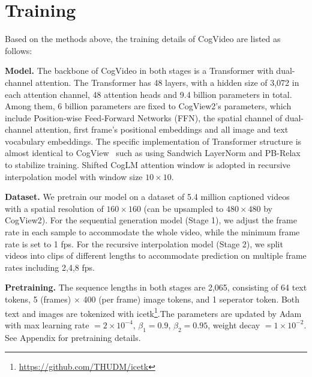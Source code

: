 
\section{Training}

Based on the methods above, the training details of CogVideo are listed as follows: 

\textbf{Model. }The backbone of CogVideo in both stages is a Transformer with dual-channel attention. The Transformer has 48 layers, with a hidden size of 3,072 in each attention channel, 48 attention heads and 9.4 billion parameters in total. Among them, 6 billion parameters are fixed to CogView2's parameters, which include Position-wise Feed-Forward Networks (FFN), the spatial channel of dual-channel attention, first frame's positional embeddings and all image and text vocabulary embeddings. The specific implementation of Transformer structure is almost identical to CogView~\cite{ding2021cogview} such as using Sandwich LayerNorm and PB-Relax to stabilize training. Shifted CogLM attention window is adopted in recursive interpolation model with window size $10 \times 10$. 

\textbf{Dataset. }We pretrain our model on a dataset of 5.4 million captioned videos with a spatial resolution of $160\times 160$ (can be upsampled to $480\times 480$ by CogView2). For the sequential generation model (Stage 1), we adjust the frame rate in each sample to accommodate the whole video, while the minimum frame rate is set to 1 fps. For the recursive interpolation model (Stage 2), we split videos into clips of different lengths to accommodate prediction on multiple frame rates including 2,4,8 fps. 

\textbf{Pretraining. }The sequence lengths in both stages are 2,065, consisting of 64 text tokens, 5 (frames) $\times$ 400 (per frame)  image tokens, and 1 seperator token. Both text and images are tokenized with icetk\footnote{\url{https://github.com/THUDM/icetk}}.The parameters are updated by Adam with max learning rate $= 2\times10^{-4}$, $\beta_1 = 0.9$, $\beta_2 = 0.95$, weight decay $=1\times10^{-2}$. See Appendix for pretraining details. 
